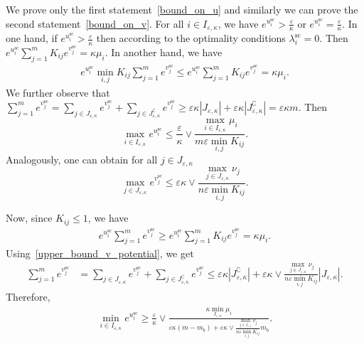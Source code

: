 \documentclass{article}
\begin{document}
We prove only the first statement~\eqref{bound_on_u} and similarly we can prove the second statement~\eqref{bound_on_v}.
For all $i\in I_{\varepsilon,\kappa}$, we have $e^{u^{\text{sc}}_i} > \frac \varepsilon\kappa$ or $e^{u^{\text{sc}}_i} = \frac \varepsilon\kappa$. In one hand, if $e^{u^{\text{sc}}_i} > \frac \varepsilon\kappa$ then according to the optimality conditions $\lambda^{\text{sc}}_i = 0.$ Then $e^{u^{\text{sc}}_i} \sum_{j=1}^m K_{ij} e^{v^{\text{sc}}_j} = \kappa\mu_i$.
In another hand, we have 
\begin{align*}
e^{u^{\text{sc}}_i} \min_{i,j}K_{ij} \sum_{j=1}^m e^{v^{\text{sc}}_j} \leq e^{u^{\text{sc}}_i} \sum_{j=1}^m K_{ij} e^{v^{\text{sc}}_j} = \kappa\mu_i.
\end{align*}
We further observe that $\sum_{j=1}^m e^{v^{\text{sc}}_j} = \sum_{j \in J_{\varepsilon,\kappa}} e^{v^{\text{sc}}_j} + \sum_{j \in J^\complement_{\varepsilon,\kappa}} e^{v^{\text{sc}}_j} \geq \varepsilon\kappa |J_{\varepsilon,\kappa}| + \varepsilon\kappa |J^\complement_{\varepsilon,\kappa}|=\varepsilon\kappa m.$ Then
\begin{equation*}
\max_{i\in I_{\varepsilon,\kappa}} e^{u^{\text{sc}}_i} \leq \frac \varepsilon\kappa \vee \frac{\max_{i\in I_{\varepsilon,\kappa}}\mu_i}{m\varepsilon \min_{i,j}K_{ij}}.
\end{equation*}
Analogously, one can obtain for all $j\in J_{\varepsilon,\kappa}$
\begin{equation}
\label{upper_bound_v_potential}
\max_{j\in J_{\varepsilon,\kappa}}e^{v^{\text{sc}}_j} \leq \varepsilon\kappa \vee \frac{\max_{j \in J_{\varepsilon,\kappa}} \nu_j}{n\varepsilon\min_{i,j}K_{ij}}.
\end{equation}

Now, since $K_{ij} \leq 1$, we have 
\begin{align*}
e^{u^{\text{sc}}_i} \sum_{j=1}^m e^{v^{\text{sc}}_j} \geq e^{u^{\text{sc}}_i} \sum_{j=1}^m K_{ij}e^{v^{\text{sc}}_j} = \kappa\mu_i.
\end{align*}
Using~\eqref{upper_bound_v_potential}, we get 
\begin{align*}
\sum_{j=1}^m e^{v^{\text{sc}}_j} &= \sum_{j \in J_{\varepsilon,\kappa}} e^{v^{\text{sc}}_j} + \sum_{j \in J^\complement_{\varepsilon,\kappa}} e^{v^{\text{sc}}_j}
\leq \varepsilon\kappa |J^\complement_{\varepsilon,\kappa}| + \varepsilon\kappa \vee \frac{\max_{j\in J_{\varepsilon,\kappa}} \nu_j}{n\varepsilon\min_{i,j}K_{ij}} |J_{\varepsilon,\kappa}|.
\end{align*}
Therefore,
\begin{align*}
\min_{i \in I_{\varepsilon,\kappa}} e^{u^{\text{sc}}_i}  \geq \frac \varepsilon\kappa \vee \frac{\kappa\min_{I_{\varepsilon,\kappa}}\mu_i}{\varepsilon\kappa (m-m_b) + \varepsilon\kappa \vee \frac{\max_{j\in J_{\varepsilon,\kappa}} \nu_j}{n\varepsilon\min_{i,j}K_{ij}} m_b}.
\end{align*}
\end{document}
